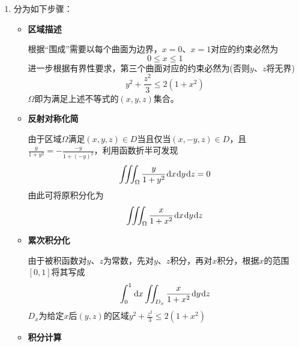 \documentclass[a4paper,UTF8,fontset=windows,AutoFakeBold]{ctexart}
\newcommand*{\dr}{\hspace{0.07em}\mathrm{d}}
\theoremstyle{ex}
\begin{document}
\begin{enumerate}
\begin{itemize}
        \item \textbf{积分计算}
            
        由于$\cos(2\theta)=\cos(2(2\pi-\theta))$，在上述第三个积分中将$\theta$换元为$2\pi-\theta$可发现值与第一个积分相等。将第二个积分拆分为$3\pi/4$到$\pi$与$\pi$到$5\pi/4$两段，分别将$\theta$换元为$\pi-\theta$与$\theta-\pi$可发现值与第一个积分相等。综合以上，结果可化为
        $$\frac{4}{\sqrt6}\int_0^{\pi/4}\dr\theta\int_0^{\sqrt{\cos(2\theta)}}r^3\dr r$$
        直接对$r$积分得到其为
        $$\frac{1}{\sqrt6}\int_0^{\pi/4}\cos^2(2\theta)\dr\theta$$
        换元$r=2\theta$得到其为
        $$\frac{1}{2\sqrt6}\int_0^{\pi/2}\cos^2\theta\dr\theta$$
        利用对称性将$\theta$换元为$\frac{\pi}{2}-\theta$可得
        $$\int_0^{\pi/2}\cos^2\theta\dr\theta=\int_0^{\pi/2}\sin^2\theta\dr\theta$$
        从而
        $$\frac{1}{2\sqrt6}\int_0^{\pi/2}\cos^2\theta\dr\theta=\frac{1}{4\sqrt6}\int_0^{\pi/2}(\cos^2\theta+\sin^2\theta)\dr\theta=\frac{\sqrt6\pi}{48}$$
    \end{itemize}

    \item 分为如下步骤：
    \begin{itemize}
        \item \textbf{区域描述}
            
        根据``围成''需要以每个曲面为边界，$x=0$、$x=1$对应的约束必然为
        $$0\le x\le 1$$
        进一步根据有界性要求，第三个曲面对应的约束必然为(否则$y$、$z$将无界)
        $$y^2+\frac{z^2}{3}\le2(1+x^2)$$
        $\Omega$即为满足上述不等式的$(x,y,z)$集合。

        \item \textbf{反射对称化简}
            
        由于区域$\Omega$满足$(x,y,z)\in D$当且仅当$(x,-y,z)\in D$，且$\frac{y}{1+y^2}=-\frac{-y}{1+(-y)^2}$，利用函数折半可发现
        $$\iiint_\Omega\frac{y}{1+y^2}\dr x\dr y\dr z=0$$
        由此可将原积分化为
        $$\iiint_\Omega\frac{x}{1+x^2}\dr x\dr y\dr z$$

        \item \textbf{累次积分化}
            
        由于被积函数对$y$、$z$为常数，先对$y$、$z$积分，再对$x$积分，根据$x$的范围$[0,1]$将其写成
        $$\int_0^1\dr x\iint_{D_x}\frac{x}{1+x^2}\dr y\dr z$$
        $D_x$为给定$x$后$(y,z)$的区域$y^2+\frac{z^2}{3}\le2(1+x^2)$

        \item \textbf{积分计算}
            

\end{itemize}
\end{enumerate}
\end{document}
